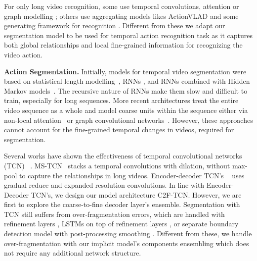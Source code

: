 \documentclass[10pt,twocolumn,letterpaper]{article}
\newcommand{\modelname}{C2F-TCN}
\begin{document}
For only long video recognition, some use temporal convolutions\cite{highlevel-hussein2019timeception}, attention \cite{highlevel-hussein2020pic, highlevel-hussein2019videograph} or graph modelling \cite{highlevel-hussein2019videograph}; others use aggregating models likes ActionVLAD \cite{highlevel-girdhar2017actionvlad} and some generating framework for recognition \cite{kuehne2014language}. Different from these we adapt our segmentation model to be used for temporal action recognition task as it captures both global relationships and local fine-grained information for recognizing the video action. 


\textbf{Action Segmentation.}
Initially, models for temporal video segmentation were based on statistical length modelling~\cite{prevsegment-statis-richard2016temporal}, RNNs \cite{prevsegmentrnn-perrett2017recurrent, prevsegmentrnn-singh2016multi, prevsegmentrnn-perrett2017recurrent}, and RNNs combined with Hidden Markov models~\cite{prevsegmentrnn-kuehne2018hybrid}. The recursive nature of RNNs make them slow and difficult to train, especially for long sequences. 
More recent architectures treat the entire video sequence as a whole and model coarse units within the sequence either via non-local attention~\cite{sener2020temporal} or graph convolutional networks~\cite{huang2020improving}.
However, these approaches cannot account for the fine-grained temporal changes in videos, required for segmentation.

Several works have shown the effectiveness of temporal convolutional networks (TCN) ~\cite{TED-ding2018weakly, TED-lea2017temporal, TEDresi-lei2018temporal, farha2019ms, li2020ms}.  MS-TCN~\cite{farha2019ms, li2020ms} stacks a temporal convolutions with dilation, without max-pool to capture the relationships in long videos. Encoder-decoder TCN's ~\cite{TED-ding2018weakly, TED-lea2017temporal, TEDresi-lei2018temporal} uses gradual reduce and expanded resolution convolutions.
In line with Encoder-Decoder TCN's, we design our model architecture \modelname{}. However, we are first to explore the coarse-to-fine decoder layer's ensemble. Segmentation with TCN still suffers from over-fragmentation errors, which are handled with refinement layers \cite{farha2019ms, li2020ms}, LSTMs on top of refinement layers \cite{wang2020gated}, or separate boundary detection model with post-processing smoothing \cite{wang2020boundary, ishikawa2021alleviating}. Different from these, we handle over-fragmentation with our implicit model's components ensembling which does not require any additional network structure.
\end{document}
